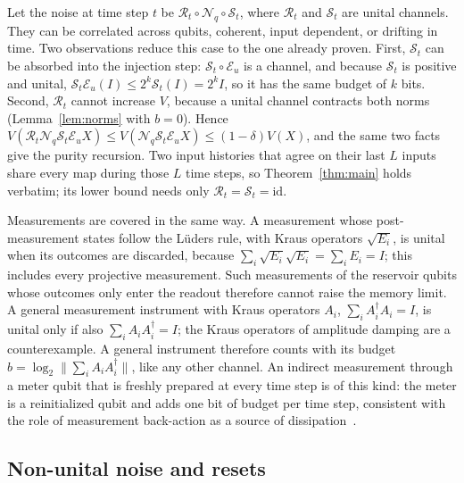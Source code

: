 \documentclass[aps,prl,twocolumn,superscriptaddress,floatfix]{revtex4-2}
\theoremstyle{plain}
\newcommand{\Norm}[1]{\lVert #1\rVert}
\newcommand{\cE}{\mathcal E}
\newcommand{\Nq}{\mathcal N_q}
\begin{document}
Let the noise at time step $t$ be $\mathcal R_t\circ\Nq\circ\mathcal S_t$, where $\mathcal R_t$ and $\mathcal S_t$ are unital channels. They can be correlated across qubits, coherent, input dependent, or drifting in time. Two observations reduce this case to the one already proven. First, $\mathcal S_t$ can be absorbed into the injection step: $\mathcal S_t\circ\cE_u$ is a channel, and because $\mathcal S_t$ is positive and unital, $\mathcal S_t\cE_u(I)\le2^k\mathcal S_t(I)=2^kI$, so it has the same budget of $k$ bits. Second, $\mathcal R_t$ cannot increase $V$, because a unital channel contracts both norms (Lemma~\ref{lem:norms} with $b=0$). Hence $V(\mathcal R_t\Nq\mathcal S_t\cE_uX)\le V(\Nq\mathcal S_t\cE_uX)\le(1-\delta)V(X)$, and the same two facts give the purity recursion. Two input histories that agree on their last $L$ inputs share every map during those $L$ time steps, so Theorem~\ref{thm:main} holds verbatim; its lower bound needs only $\mathcal R_t=\mathcal S_t=\mathrm{id}$.

Measurements are covered in the same way. A measurement whose post-measurement states follow the L\"uders rule, with Kraus operators $\sqrt{E_i}$, is unital when its outcomes are discarded, because $\sum_i\sqrt{E_i}\sqrt{E_i}=\sum_iE_i=I$; this includes every projective measurement. Such measurements of the reservoir qubits whose outcomes only enter the readout therefore cannot raise the memory limit. A general measurement instrument with Kraus operators $A_i$, $\sum_iA_i^\dagger A_i=I$, is unital only if also $\sum_iA_iA_i^\dagger=I$; the Kraus operators of amplitude damping are a counterexample. A general instrument therefore counts with its budget $b=\log_2\Norm{\sum_iA_iA_i^\dagger}$, like any other channel. An indirect measurement through a meter qubit that is freshly prepared at every time step is of this kind: the meter is a reinitialized qubit and adds one bit of budget per time step, consistent with the role of measurement back-action as a source of dissipation~\cite{MorguiSancho2026}.

\subsection{Non-unital noise and resets}
\end{document}
